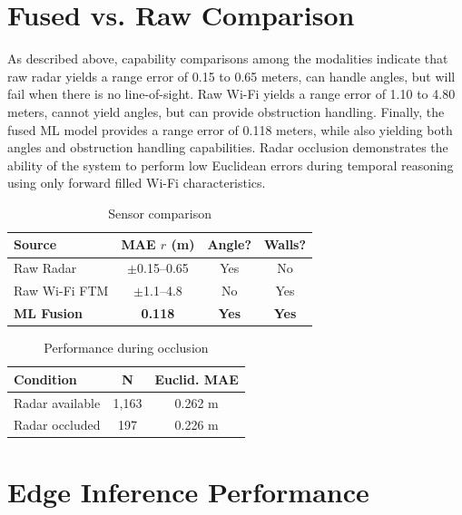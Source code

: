 \section{Fused vs. Raw Comparison}
\label{sec:fusedraw}

As described above, capability comparisons among the modalities indicate that raw radar yields a range error of 0.15 to 0.65 meters, can handle angles, but will fail when there is no line-of-sight. Raw Wi-Fi yields a range error of 1.10 to 4.80 meters, cannot yield angles, but can provide obstruction handling. Finally, the fused ML model provides a range error of 0.118 meters, while also yielding both angles and obstruction handling capabilities. Radar occlusion demonstrates the ability of the system to perform low Euclidean errors during temporal reasoning using only forward filled Wi-Fi characteristics.

\begin{table}[htbp]
\centering
\caption{Sensor comparison}
\label{tab:sensor_comp}
\begin{tabular}{lccc}
\toprule
\textbf{Source} & \textbf{MAE $r$ (m)} & \textbf{Angle?} & \textbf{Walls?} \\
\midrule
Raw Radar       & $\pm$0.15--0.65      & Yes             & No              \\
Raw Wi-Fi FTM   & $\pm$1.1--4.8        & No              & Yes             \\
\textbf{ML Fusion} & \textbf{0.118}       & \textbf{Yes}    & \textbf{Yes}    \\
\bottomrule
\end{tabular}
\end{table}

\begin{table}[htbp]
\centering
\caption{Performance during occlusion}
\label{tab:perf_occlusion}
\begin{tabular}{lcc}
\toprule
\textbf{Condition} & \textbf{N} & \textbf{Euclid. MAE} \\
\midrule
Radar available    & 1,163      & 0.262 m              \\
Radar occluded     & 197        & 0.226 m              \\
\bottomrule
\end{tabular}
\end{table}

\section{Edge Inference Performance}
\label{sec:edgeinference}


